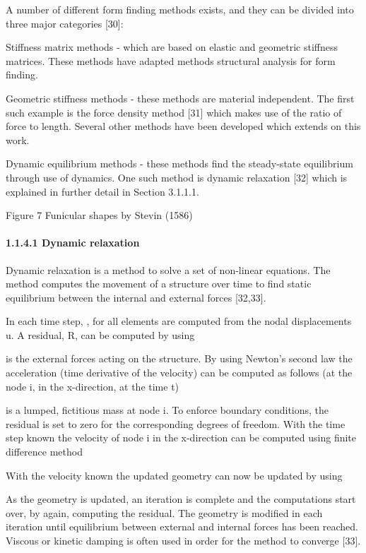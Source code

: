 A number of different form finding methods exists, and they can be divided into three major categories [30]: 

\item Stiffness matrix methods - which are based on elastic and geometric stiffness matrices. These methods have adapted methods structural analysis for form finding.

\item Geometric stiffness methods - these methods are material independent. The first such example is the force density method [31] which makes use of the ratio of force to length. Several other methods have been developed which extends on this work.

\item Dynamic equilibrium methods {}- these methods find the steady-state equilibrium through use of dynamics. One such method is dynamic relaxation [32] which is explained in further detail in Section 3.1.1.1.





Figure 7 Funicular shapes by Stevin (1586)

\paragraph[1.1.4.1 Dynamic relaxation]{1.1.4.1 Dynamic relaxation}
Dynamic relaxation is a method to solve a set of non-linear equations. The method computes the movement of a structure over time to find static equilibrium between the internal and external forces [32,33]. 



In each time step,  
 , for all elements are computed from the nodal displacements u. A residual, R, can be computed by using 



 is the external forces acting on the structure. By using Newton’s second law the acceleration (time derivative of the velocity) can be computed as follows (at the node i, in the x-direction, at the time t)


 is a lumped, fictitious mass at node i. To enforce boundary conditions, the residual is set to zero for the corresponding degrees of freedom. With the time step known the velocity of node i in the x-direction can be computed using finite difference method

With the velocity known the updated geometry can now be updated by using

As the geometry is updated, an iteration is complete and the computations start over, by again, computing the residual. The geometry is modified in each iteration until equilibrium between external and internal forces has been reached. Viscous or kinetic damping is often used in order for the method to converge [33].



